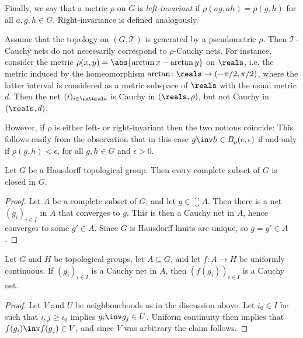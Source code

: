 \documentclass[article, a4paper, 11pt, oneside]{memoir}
\numberwithin{equation}{chapter}
\newcommand{\calT}{\mathcal{T}}
\begin{document}
Finally, we say that a metric $\rho$ on $G$ is \emph{left-invariant} if $\rho(ag,ah) = \rho(g,h)$ for all $a,g,h \in G$. Right-invariance is defined analogously.

\begin{remark}
    Assume that the topology on $(G,\calT)$ is generated by a pseudometric $\rho$. Then $\calT$-Cauchy nets do not necessarily correspond to $\rho$-Cauchy nets. For instance, consider the metric $\rho(x,y) = \abs{\arctan x - \arctan y}$ on $\reals$, i.e. the metric induced by the homeomorphism $\arctan \colon \reals \to (-\pi/2, \pi/2)$, where the latter interval is considered as a metric subspace of $\reals$ with the usual metric $d$. Then the net $(i)_{i \in \naturals}$ is Cauchy in $(\reals, \rho)$, but not Cauchy in $(\reals, d)$.

    However, if $\rho$ is either left- or right-invariant then the two notions coincide: This follows easily from the observation that in this case $g\inv h \in \ball[\rho]{e}{\epsilon}$ if and only if $\rho(g,h) < \epsilon$, for all $g,h \in G$ and $\epsilon > 0$.
\end{remark}


\begin{proposition}
    \label{thm:complete-implies-closed}
    Let $G$ be a Hausdorff topological group. Then every complete subset of $G$ is closed in $G$.
\end{proposition}

\begin{proof}
    Let $A$ be a complete subset of $G$, and let $g \in \closure{A}$. Then there is a net $(g_i)_{i \in I}$ in $A$ that converges to $g$. This is then a Cauchy net in $A$, hence converges to some $g' \in A$. Since $G$ is Hausdorff limits are unique, so $g = g' \in A$.
\end{proof}


\begin{lemma}
    Let $G$ and $H$ be topological groups, let $A \subseteq G$, and let $f \colon A \to H$ be uniformly continuous. If $(g_i)_{i \in I}$ is a Cauchy net in $A$, then $(f(g_i))_{i \in I}$ is a Cauchy net.
\end{lemma}

\begin{proof}
    Let $V$ and $U$ be neighbourhoods as in the discussion above. Let $i_0 \in I$ be such that $i,j \geq i_0$ implies $g_i\inv g_j \in U$. Uniform continuity then implies that $f(g_i)\inv f(g_j) \in V$, and since $V$ was arbitrary the claim follows.
\end{proof}
\end{document}
